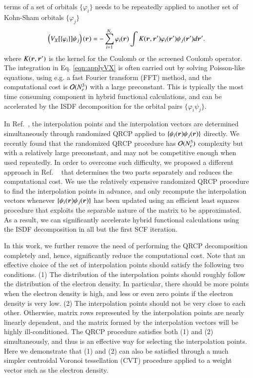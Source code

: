 terms of a set of orbitals $\{\varphi_i\}$ needs to be repeatedly applied to
another set of Kohn-Sham orbitals $\{\varphi_j\}$
\begin{equation}\label{eqn:applyVX}
  \left(V_{X}[\{\varphi_{i}\}]\psi_{j}\right)(\bm{r}) =
  -\sum_{i=1}^{N_{e}} \varphi_{i}(\bm{r}) \int K(\bm{r},\bm{r}')
  \varphi_{i}(\bm{r}')\psi_{j}(\bm{r}') d\bm{r}'.
\end{equation}
where $K(\bm{r},\bm{r}')$ is the kernel for the Coulomb or the screened Coulomb
operator.  The integration in Eq. \ref{eqn:applyVX} is often carried out by
solving Poisson-like equations, using e.g. a fast Fourier transform (FFT)
method, and the computational cost is $\mathcal{O}(N_e^3)$ with a large preconstant.
This is typically the most time consuming component in hybrid functional
calculations, and can be accelerated by the ISDF decomposition for the orbital
pairs $\{\varphi_{i}\psi_{j}\}$.

In Ref.~\cite{JCP_302_329_2015_ISDF}, the interpolation points and the
interpolation vectors are determined simultaneously through randomized QRCP
applied to $\{\psi_{i}(\bm{r})\psi_{j}(\bm{r})\}$ directly. We recently found that the
randomized QRCP procedure has $\mathcal{O}(N_{e}^3)$ complexity but with a relatively
large preconstant, and may not be competitive enough when used repeatedly. In
order to overcome such difficulty, we proposed a different approach in Ref.
~\cite{JCTC_2017_ISDF} that determines the two parts separately and reduces the
computational cost. We use the relatively expensive randomized QRCP procedure to
find the interpolation points in advance, and only recompute the interpolation
vectors whenever $\{\psi_{i}(\bm{r})\psi_{j}(\bm{r})\}$ has been updated using an
efficient least squares procedure that exploits the separable nature of the
matrix to be approximated. As a result, we can significantly accelerate hybrid
functional calculations using the ISDF decomposition in all but the first SCF
iteration.

In this work, we further remove the need of performing the QRCP decomposition
completely and, hence, significantly reduce the computational cost. Note that an
effective choice of the set of interpolation points should satisfy the following
two conditions. (1) The distribution of the interpolation points should roughly
follow the distribution of the electron density. In particular, there should be
more points when the electron density is high, and less or even zero points if
the electron density is very low. (2) The interpolation points should not be very
close to each other.  Otherwise, matrix rows represented by the interpolation
points are nearly linearly dependent, and the matrix formed by the interpolation
vectors will be highly ill-conditioned.  The QRCP procedure satisfies both (1)
and (2) simultaneously, and thus is an effective way for selecting the
interpolation points.  Here we demonstrate that (1) and (2) can also be satisfied
through a much simpler centroidal Voronoi tessellation (CVT) procedure applied
to a weight vector such as the electron density.

